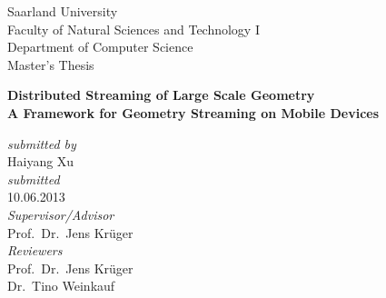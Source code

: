 
\begin{titlepage} 

\begin{center}
    
Saarland University\\
Faculty of Natural Sciences and Technology I \\
Department of Computer Science \\[1.5cm]


{\Large Master's Thesis}\\[2.0cm]
 { 

{\LARGE \bfseries Distributed Streaming of Large Scale Geometry}\\[0.5cm]
{\Large \bfseries
 A Framework for Geometry Streaming on Mobile Devices} \\[1.5cm]
}
    
\begin{normalsize}
  \emph{submitted by}\\
  Haiyang Xu\\[1.2cm]
  
    \emph{submitted}\\
    10.06.2013\\[1.2cm]
    
  
  \emph{Supervisor/Advisor} \\
  Prof.~Dr.~Jens Kr\"uger\\[1.2cm]

  
  \emph{Reviewers} \\
  Prof.~Dr.~Jens Kr\"uger \\[0.1cm]
  Dr.~Tino Weinkauf \\[0.1cm]
\end{normalsize}

\end{center}


\end{titlepage}

%
%

